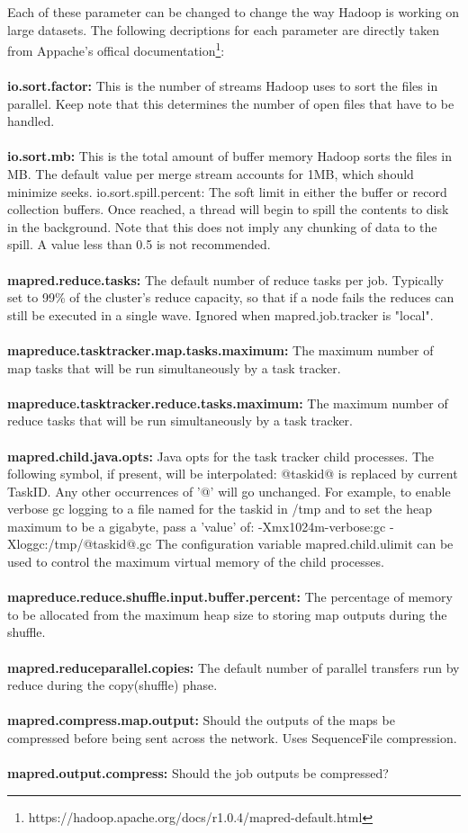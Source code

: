 Each of these parameter can be changed to change the way Hadoop is working on large datasets. The following decriptions for each parameter are directly taken from Appache's offical documentation\footnote{https://hadoop.apache.org/docs/r1.0.4/mapred-default.html}:
\\\\
\textbf{io.sort.factor:} This is the number of streams Hadoop uses to sort the files in parallel. Keep note that this determines the number of open files that have to be handled.
\\\\
\textbf{io.sort.mb:} This is the total amount of buffer memory Hadoop sorts the files in MB. The default value per merge stream accounts for 1MB, which should minimize seeks.
io.sort.spill.percent: The soft limit in either the buffer or record collection buffers. Once reached, a thread will begin to spill the contents to disk in the background. Note that this does not imply any chunking of data to the spill. A value less than 0.5 is not recommended.
\\\\
\textbf{mapred.reduce.tasks:} The default number of reduce tasks per job. Typically set to 99\% of the cluster's reduce capacity, so that if a node fails the reduces can still be executed in a single wave. Ignored when mapred.job.tracker is "local".
\\\\
\textbf{mapreduce.tasktracker.map.tasks.maximum:} The maximum number of map tasks that will be run simultaneously by a task tracker.
\\\\
\textbf{mapreduce.tasktracker.reduce.tasks.maximum:} The maximum number of reduce tasks that will be run simultaneously by a task tracker.
\\\\
\textbf{mapred.child.java.opts:} Java opts for the task tracker child processes. The following symbol, if present, will be interpolated: @taskid@ is replaced by current TaskID. Any other occurrences of '@' will go unchanged. For example, to enable verbose gc logging to a file named for the taskid in /tmp and to set the heap maximum to be a gigabyte, pass a 'value' of: -Xmx1024m-verbose:gc -Xloggc:/tmp/@taskid@.gc The configuration variable mapred.child.ulimit can be used to control the maximum virtual memory of the child processes.
\\\\
\textbf{mapreduce.reduce.shuffle.input.buffer.percent:} The percentage of memory to be allocated from the maximum heap size to storing map outputs during the shuffle.
\\\\
\textbf{mapred.reduceparallel.copies:} The default number of parallel transfers run by reduce during the copy(shuffle) phase.
\\\\
\textbf{mapred.compress.map.output:} Should the outputs of the maps be compressed before being sent across the network. Uses SequenceFile compression.
\\\\
\textbf{mapred.output.compress:} Should the job outputs be compressed?

